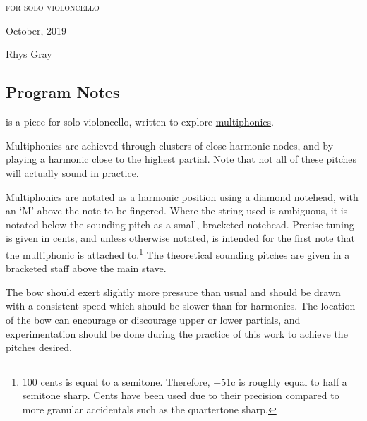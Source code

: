 
\chapter[\celloPiece]{}

\vspace*{3cm}
\begin{center}
\textsc{for solo violoncello}

\vspace*{3.5cm}

\HRule{0.5pt}


\LARGE \textbf{\uppercase{\celloPiece}}
\HRule{2pt}

\vspace{1.3cm}

\normalsize October, 2019
\date{}

\vspace*{5\baselineskip}

Rhys Gray

\end{center}
\newpage
\newpage

\section*{Program Notes}
\celloPiece\space is a piece for solo violoncello, written to explore \hyperref[sec:multiphonics]{multiphonics}. 

Multiphonics are achieved through clusters of close harmonic nodes, and by playing a harmonic close to the highest partial.
  Note that not all of these pitches will actually sound in practice.
  
  Multiphonics are notated as a harmonic position using a diamond notehead, with an `M' above the note to be fingered.
  Where the string used is ambiguous, it is notated below the sounding pitch as a small, bracketed notehead.
  Precise tuning is given in cents, and unless otherwise notated, is intended for the first note that the multiphonic is attached to.\footnote{100 cents is equal to a semitone. Therefore, +51c is roughly equal to half a semitone sharp. Cents have been used due to their precision compared to more granular accidentals such as the quartertone sharp.}
  The theoretical sounding pitches are given in a bracketed staff above the main stave.

  The bow should exert slightly more pressure than usual and should be drawn with a consistent speed which should be slower than for harmonics.
  The location of the bow can encourage or discourage upper or lower partials, and experimentation should be done during the practice of this work to achieve the pitches desired.

